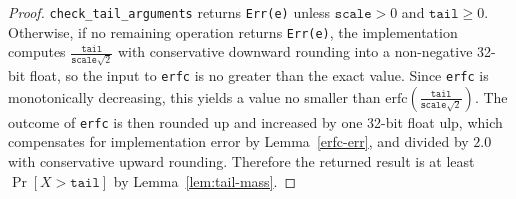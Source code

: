 \documentclass{article}
\begin{document}
\begin{proof}
    \texttt{check\_tail\_arguments} returns \texttt{Err(e)} unless $\texttt{scale} > 0$ and $\texttt{tail} \ge 0$.
    Otherwise, if no remaining operation returns \texttt{Err(e)}, the implementation computes $\frac{\texttt{tail}}{\texttt{scale} \sqrt{2}}$ with conservative downward rounding into a non-negative 32-bit float, so the input to \texttt{erfc} is no greater than the exact value.
    Since \texttt{erfc} is monotonically decreasing, this yields a value no smaller than $\mathrm{erfc}\!\left(\frac{\texttt{tail}}{\texttt{scale} \sqrt{2}}\right)$.
    The outcome of \texttt{erfc} is then rounded up and increased by one 32-bit float ulp, which compensates for implementation error by Lemma~\ref{erfc-err}, and divided by $2.0$ with conservative upward rounding.
    Therefore the returned result is at least $\Pr[X > \texttt{tail}]$ by Lemma~\ref{lem:tail-mass}.
\end{proof}
\end{document}

